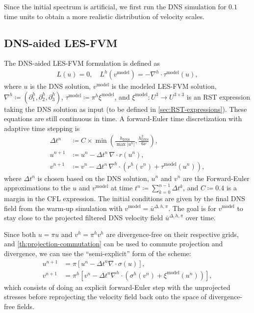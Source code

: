 \documentclass[preprint,twocolumn,5p]{elsarticle}
\begin{document}
Since the initial spectrum is artificial, we first run the DNS simulation for
$0.1$ time units to obtain a more realistic distribution of velocity scales.




\subsection{DNS-aided LES-FVM}

The DNS-aided LES-FVM formulation is defined as
\begin{align}
    L(u) = 0, \quad L^h(v^\text{model}) = - \nabla^h \cdot \tau^\text{model}(u),
\end{align}
where $u$ is the DNS solution, $v^\text{model}$ is the modeled
LES-FVM solution,
$\nabla^h \coloneq (\partial^h_1, \partial^h_2, \partial^h_3)$,
$\tau^\text{model} \coloneq \pi^h \xi^\text{model}$,
and $\xi^\text{model} : U^3 \to U^{3 \times 3}$ is an RST expression
taking the DNS solution as input
(to be defined in \cref{sec:RST-expressions}).
These equations are still continuous in time.
A forward-Euler time discretization with adaptive time stepping is
\begin{align}
    \Delta t^n
    & \coloneq 
    C \times \min \left(
        \frac{h_\text{DNS}}{\max \left| u^n \right|},
        \frac{h_\text{DNS}^2}{6 \nu}
    \right), \\
    u^{n + 1}
    & \coloneq u^n - \Delta t^n \, \nabla \cdot r(u^n), \\
    v^{n + 1}
    & \coloneq v^n - \Delta t^n \, \nabla^h \cdot
    \left(r^h(v^n) + \tau^\text{model}(u^n) \right),
\end{align}
where $\Delta t^n$ is chosen based on the DNS solution,
$u^n$ and $v^n$ are the Forward-Euler approximations to the
$u$ and $v^\text{model}$ at time
$t^n \coloneq \sum_{k = 0}^{n - 1} \Delta t^k$, and $C \coloneq 0.4$ is a
margin in the CFL expression.
The initial conditions are given by the final DNS field from the warm-up
simulation with $v^\text{model} = \bar{u}^{\Delta, h, \pi}$.
The goal is for $v^\text{model}$ to stay close to the projected filtered DNS
velocity field $\bar{u}^{\Delta, h, \pi}$ over time.

Since both $u = \pi u$ and $v^h = \pi^h v^h$ are divergence-free on
their respective grids, and \cref{th:projection-commutation}
can be used to commute projection and divergence, we can use the
``semi-explicit'' form of the scheme:
\begin{align}
    u^{n + 1}
    & = \pi \left[ u^n - \Delta t^n \nabla \cdot \sigma(u) \right], \\
    v^{n + 1}
    & = \pi^h \left[
        v^n - \Delta t^n \nabla^h \cdot
        \left(\sigma^h(v^n) + \xi^\text{model}(u^n) \right)
    \right], \label{eq:ns-lesfvm-forwardeuler}
\end{align}
which consists of doing an explicit forward-Euler step with the unprojected
stresses before reprojecting the velocity field back onto the space of
divergence-free fields.
\end{document}
